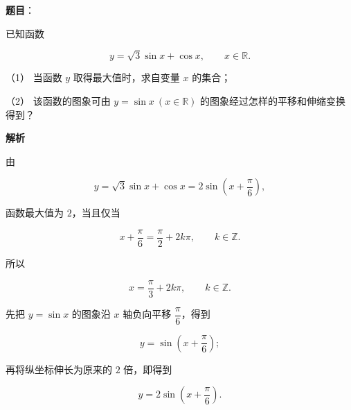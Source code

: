 \begin{answer}

\textbf{题目}：

已知函数

\nopagebreak[4]
\[
y=\sqrt3\sin x+\cos x,\qquad x\in\mathbb R.
\]

（1） 当函数 $y$ 取得最大值时，求自变量 $x$ 的集合；

（2） 该函数的图象可由 $y=\sin x\ (x\in\mathbb R)$ 的图象经过怎样的平移和伸缩变换得到？

\textbf{解析}


由

\nopagebreak[4]
\[
y=\sqrt3\sin x+\cos x
=2\sin\left(x+\frac\pi6\right),
\]

函数最大值为 $2$，当且仅当

\nopagebreak[4]
\[
x+\frac\pi6=\frac\pi2+2k\pi,
\qquad k\in\mathbb Z.
\]

所以

\nopagebreak[4]
\[
x=\frac\pi3+2k\pi,\qquad k\in\mathbb Z.
\]


先把 $y=\sin x$ 的图象沿 $x$ 轴负向平移 $\dfrac\pi6$，得到

\nopagebreak[4]
\[
y=\sin\left(x+\frac\pi6\right);
\]

再将纵坐标伸长为原来的 $2$ 倍，即得到

\nopagebreak[4]
\[
y=2\sin\left(x+\frac\pi6\right).
\]



\end{answer}
